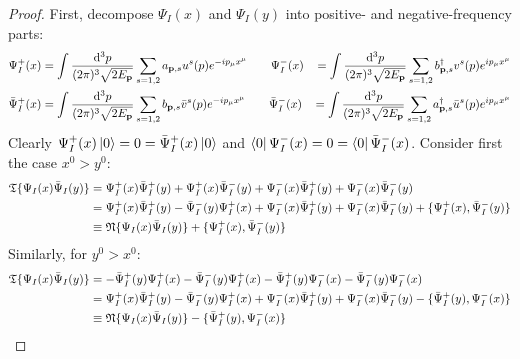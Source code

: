 \begin{proofbox}
  \begin{proof}
    First, decompose $ \Psi_I(x) $ and $ \Psi_I(y) $ into positive- and negative-frequency parts:
    \begin{align*}
      \Psi_I^+(x) &= \int \frac{\mathrm{d}^3p}{(2\pi)^3 \sqrt{2E_{\mathbf{p}}}} \sum_{s = 1,2} a_{\mathbf{p},s} u^s(p) e^{-i p_\mu x^\mu}
      \qquad
      \Psi_I^-(x) &= \int \frac{\mathrm{d}^3p}{(2\pi)^3 \sqrt{2E_{\mathbf{p}}}} \sum_{s = 1,2} b_{\mathbf{p},s}^\dagger v^s(p) e^{i p_\mu x^\mu}
      \\
      \bar{\Psi}_I^+(x) &= \int \frac{\mathrm{d}^3p}{(2\pi)^3 \sqrt{2E_{\mathbf{p}}}} \sum_{s = 1,2} b_{\mathbf{p},s} \bar{v}^s(p) e^{-i p_\mu x^\mu}
      \qquad
      \bar{\Psi}_I^-(x) &= \int \frac{\mathrm{d}^3p}{(2\pi)^3 \sqrt{2E_{\mathbf{p}}}} \sum_{s = 1,2} a_{\mathbf{p},s}^\dagger \bar{u}^s(p) e^{i p_\mu x^\mu}
    \end{align*}
    Clearly $ \Psi_I^+(x) \ket{0} = 0 = \bar{\Psi}_I^+(x) \ket{0} $ and $ \bra{0} \Psi_I^-(x) = 0 = \bra{0} \bar{\Psi}_I^-(x) $. Consider first the case $ x^0 > y^0 $:
    \begin{equation*}
      \begin{split}
        \mathfrak{T}\{\Psi_I(x) \bar{\Psi}_I(y)\}
        & = \Psi_I^+(x) \bar{\Psi}_I^+(y) + \Psi_I^+(x) \bar{\Psi}_I^-(y) + \Psi_I^-(x) \bar{\Psi}_I^+(y) + \Psi_I^-(x) \bar{\Psi}_I^-(y) \\
        & = \Psi_I^+(x) \bar{\Psi}_I^+(y) - \bar{\Psi}_I^-(y) \Psi_I^+(x) + \Psi_I^-(x) \bar{\Psi}_I^+(y) + \Psi_I^-(x) \bar{\Psi}_I^-(y) + \{\Psi_I^+(x) , \bar{\Psi}_I^-(y)\} \\
        & \equiv \mathfrak{N}\{\Psi_I(x) \bar{\Psi}_I(y)\} + \{\Psi_I^+(x) , \bar{\Psi}_I^-(y)\}
      \end{split}
    \end{equation*}
    Similarly, for $ y^0 > x^0 $:
    \begin{equation*}
      \begin{split}
        \tempord\{\Psi_I(x) \bar{\Psi}_I(y)\}
        & = -\bar{\Psi}_I^+(y) \Psi_I^+(x) - \bar{\Psi}_I^-(y) \Psi_I^+(x) - \bar{\Psi}_I^+(y) \Psi_I^-(x) - \bar{\Psi}_I^-(y) \Psi_I^-(x) \\
        & = \Psi_I^+(x) \bar{\Psi}_I^+(y) - \bar{\Psi}_I^-(y) \Psi_I^+(x) + \Psi_I^-(x) \bar{\Psi}_I^+(y) + \Psi_I^-(x) \bar{\Psi}_I^-(y) - \{\bar{\Psi}_I^+(y) , \Psi_I^-(x)\} \\
        & \equiv \normord\{\Psi_I(x) \bar{\Psi}_I(y)\} - \{\bar{\Psi}_I^+(y) , \Psi_I^-(x)\}
      \end{split}

\end{equation*}
\end{proof}
\end{proofbox}
